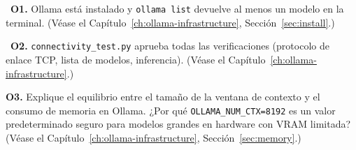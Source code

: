 \begin{Form}
\vs

\noindent\CheckBox[name=o1,width=0.4cm,height=0.4cm]{}~\textbf{O1.}
Ollama está instalado y \texttt{ollama list} devuelve al menos un
modelo en la terminal.
(Véase el Capítulo~\ref{ch:ollama-infrastructure},
Sección~\ref{sec:install}.)

\vs

\noindent\CheckBox[name=o2,width=0.4cm,height=0.4cm]{}~\textbf{O2.}
\texttt{connectivity\_test.py} aprueba todas las verificaciones
(protocolo de enlace TCP, lista de modelos, inferencia).
(Véase el Capítulo~\ref{ch:ollama-infrastructure}.)

\vs

\noindent\textbf{O3.} Explique el equilibrio entre el tamaño de la
ventana de contexto y el consumo de memoria en Ollama. ¿Por qué
\texttt{OLLAMA\_NUM\_CTX=8192} es un valor predeterminado seguro
para modelos grandes en hardware con VRAM limitada?
(Véase el Capítulo~\ref{ch:ollama-infrastructure},
Sección~\ref{sec:memory}.)\\[4pt]
\TextField[name=o3,width=\linewidth,height=3cm,multiline=true,
           bordercolor=black]{}

\end{Form}
